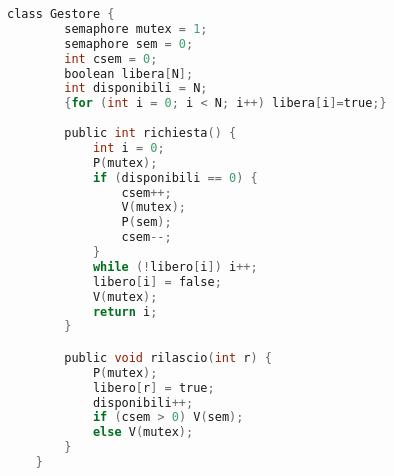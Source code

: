 \begin{lstlisting}[language=C]
    class Gestore {
        semaphore mutex = 1;
        semaphore sem = 0;
        int csem = 0;
        boolean libera[N];
        int disponibili = N;
        {for (int i = 0; i < N; i++) libera[i]=true;}
        
        public int richiesta() {
            int i = 0;
            P(mutex);
            if (disponibili == 0) {
                csem++;
                V(mutex);
                P(sem);
                csem--;
            }
            while (!libero[i]) i++;
            libero[i] = false;
            V(mutex);
            return i;
        }

        public void rilascio(int r) {
            P(mutex);
            libero[r] = true;
            disponibili++;
            if (csem > 0) V(sem);
            else V(mutex);
        }
    }
\end{lstlisting}





